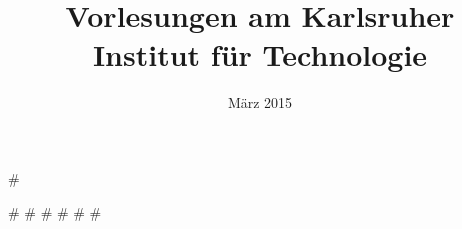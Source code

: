 \documentclass[a4paper,11pt,titlepage]{scrbook}
\title{Vorlesungen am Karlsruher Institut für Technologie}
\date{März 2015}
\begin{document}
\maketitle
\tableofcontents

#

#
#
#
#
#
#
\end{document}
